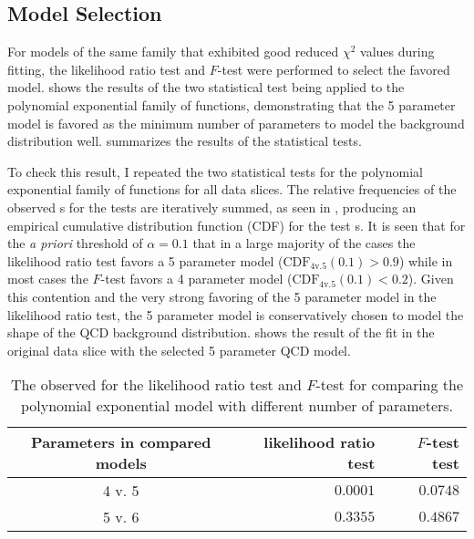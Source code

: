 \subsection{Model Selection}\label{sec:model_selection}

For models of the same family that exhibited good reduced $\chi^2$ values during fitting, the likelihood ratio test and $F$-test were performed to select the favored model.
 shows the results of the two statistical test being applied to the polynomial exponential family of functions, demonstrating that the 5 parameter model is favored as the minimum number of parameters to model the background distribution well.
 summarizes the results of the statistical tests.

To check this result, I repeated the two statistical tests for the polynomial exponential family of functions for all \CRQCD{} data slices.
The relative frequencies of the observed \pvalue{}s for the tests are iteratively summed, as seen in , producing an empirical cumulative distribution function (CDF) for the test \pvalue{}s.
It is seen that for the \emph{a priori} threshold of $\alpha=0.1$ that in a large majority of the cases the likelihood ratio test favors a 5 parameter model ($\textrm{CDF}_{4\textrm{v.}5}\left(0.1\right) > 0.9$) while in most cases the $F$-test favors a 4 parameter model ($\textrm{CDF}_{4\textrm{v.}5}\left(0.1\right) < 0.2$).
Given this contention and the very strong favoring of the 5 parameter model in the likelihood ratio test, the 5 parameter model is conservatively chosen to model the shape of the QCD background distribution.
 shows the result of the fit in the original data slice with the selected 5 parameter QCD model.

\begin{table}[htbp]
 \centering
 \caption[The observed \pvalue{} for the likelihood ratio test and $F$-test for comparing the polynomial exponential model with different number of parameters.]{%
  The observed \pvalue{} for the likelihood ratio test and $F$-test for comparing the polynomial exponential model with different number of parameters.}
 \label{table:stat_test_parameters}
 \begin{tabular}{@{}crr@{}} \toprule
  Parameters in compared models & likelihood ratio test \pvalue{} & $F$-test test \pvalue{} \\ \midrule
  4 v. 5                        & $0.0001$                        & $0.0748$                \\
  5 v. 6                        & $0.3355$                        & $0.4867$                \\
  \bottomrule
 \end{tabular}
\end{table}

